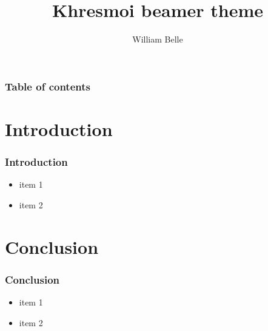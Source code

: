 \documentclass{beamer}
\title{Khresmoi beamer theme}
\author{William Belle}
\begin{document}
  \begin{frame}[plain]
    \titlepage
  \end{frame} 
  
  \begin{frame}
    \frametitle{Table of contents} 
    \tableofcontents
  \end{frame}
  
  \section{Introduction}
  \begin{frame}
    \frametitle{Introduction}
    \begin{itemize}
      \item item 1
      \item item 2
    \end{itemize}
  \end{frame} 
  
  \section{Conclusion}
  \begin{frame}
    \frametitle{Conclusion}
    \begin{itemize}
      \item item 1
      \item item 2
    \end{itemize}
  \end{frame} 
\end{document}
